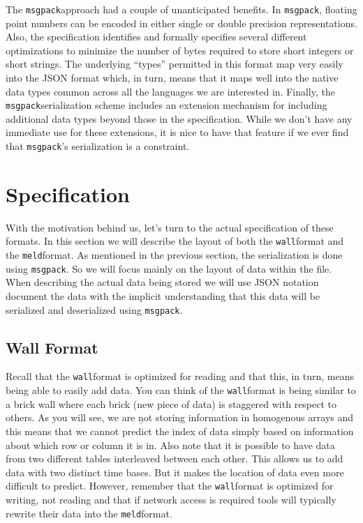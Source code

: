 \documentclass[11pt,a4paper,twocolumn]{article}
\newcommand{\wall}{\texttt{wall}}
\newcommand{\meld}{\texttt{meld}}
\newcommand{\msgpack}{\texttt{msgpack}}
\begin{document}
The \msgpack approach had a couple of unanticipated benefits.  In
\msgpack, floating point numbers can be encoded in either single or
double precision representations.  Also, the specification identifies
and formally specifies several different optimizations to minimize the
number of bytes required to store short integers or short strings.
The underlying ``types'' permitted in this format map very easily into
the JSON format which, in turn, means that it maps well into the
native data types common across all the languages we are interested
in.  Finally, the \msgpack serialization scheme includes an extension
mechanism for including additional data types beyond those in the
specification.  While we don't have any immediate use for these
extensions, it is nice to have that feature if we ever find that
\msgpack's serialization is a constraint.

\section{Specification}
\label{sec:spec}

With the motivation behind us, let's turn to the actual specification
of these formats.  In this section we will describe the layout of both
the \wall format and the \meld format.  As mentioned in the previous
section, the serialization is done using \msgpack.  So we will focus
mainly on the layout of data within the file.  When describing the
actual data being stored we will use JSON notation document the data
with the implicit understanding that this data will be serialized and
deserialized using \msgpack.



\subsection{Wall Format}
\label{sec:wall_spec}

Recall that the \wall format is optimized for reading and that this,
in turn, means being able to easily add data.  You can think of the
\wall format is being similar to a brick wall where each brick (new
piece of data) is staggered with respect to others.  As you will see,
we are {\b not} storing information in homogenous arrays and this means
that we cannot predict the index of data simply based on information
about which row or column it is in.  Also note that it is possible to
have data from two different tables interleaved between each other.
This allows us to add data with two distinct time bases.  But it makes
the location of data even more difficult to predict.  However,
remember that the \wall format is optimized for writing, not reading
and that if network access is required tools will typically rewrite
their data into the \meld format.
\end{document}
